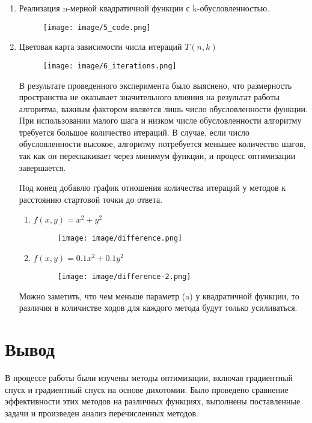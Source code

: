 \documentclass[12pt, a4paper]{article}
\begin{document}
\begin{enumerate}
\item Реализация n-мерной квадратичной функции с k-обусловленностью.

\begin{figure}[h]
\centering
\texttt{[image: image/5\_code.png]}
\end{figure}

\item Цветовая карта зависимости числа итераций $T(n,k)$

\begin{figure}[h]
\centering
\texttt{[image: image/6\_iterations.png]}
\end{figure}

В результате проведенного эксперимента было выяснено, что размерность пространства не оказывает значительного влияния на результат работы алгоритма, важным фактором является лишь число обусловленности функции. При использовании малого шага и низком числе обусловленности алгоритму требуется большое количество итераций. В случае, если число обусловленности высокое, алгоритму потребуется меньшее количество шагов, так как он перескакивает через минимум функции, и процесс оптимизации завершается.

Под конец добавлю график отношения количества итераций у методов к расстоянию стартовой точки до ответа.

\newpage

\begin{enumerate}
    \item $f(x, y) = x^2 + y^2$
    \begin{figure}[h]
    \centering
    \texttt{[image: image/difference.png]}
    \end{figure}
    
    \item $f(x, y) = 0.1x^2 + 0.1y^2$
    \begin{figure}[h]
    \centering
    \texttt{[image: image/difference-2.png]}
    \end{figure}
\end{enumerate}

Можно заметить, что чем меньше параметр (a) у квадратичной функции, то различия в количистве ходов для каждого метода будут только усиливаться.
\end{enumerate}

\section{Вывод}
В процессе работы были изучены методы оптимизации, включая градиентный спуск и градиентный спуск на основе дихотомии. Было проведено сравнение эффективности этих методов на различных функциях, выполнены поставленные задачи и произведен анализ перечисленных методов.
\end{document}
